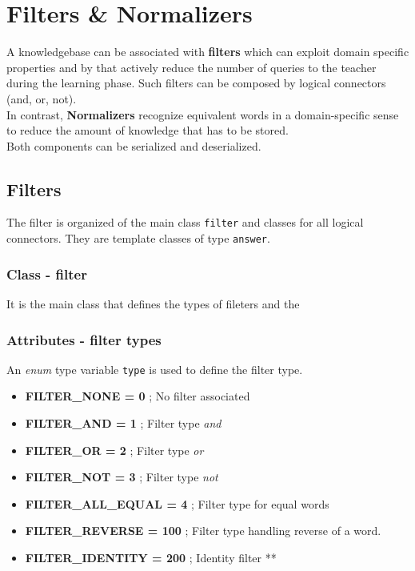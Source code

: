 \chapter{Filters \& Normalizers}
A knowledgebase can be associated with \textbf{filters} which can exploit domain specific properties and by that actively reduce the number of queries to the teacher during the learning phase. Such filters can be composed by logical connectors (and, or, not). \\
In contrast, \textbf{Normalizers} recognize equivalent words in a domain-specific sense to reduce the amount of knowledge that has to be stored. \\
Both components can be serialized and deserialized.

\section{Filters}
The filter is organized of the main class \texttt{filter} and classes for all logical connectors. They are template classes of type \texttt{answer}. 

\subsection{Class - filter}
It is the main class that defines the types of fileters and the 

\subsection*{Attributes - filter types}
An \emph{enum} type variable \texttt{type} is used to define the filter type.
\begin{itemize}
 \item \textbf{FILTER\_NONE = 0} ; No filter associated
 \item \textbf{FILTER\_AND = 1} ; Filter type \emph{and}
 \item \textbf{FILTER\_OR = 2} ; Filter type \emph{or}
 \item \textbf{FILTER\_NOT = 3} ; Filter type \emph{not}
 \item \textbf{FILTER\_ALL\_EQUAL = 4} ; Filter type for equal words
 \item \textbf{FILTER\_REVERSE = 100} ; Filter type handling reverse of a word.
 \item \textbf{FILTER\_IDENTITY = 200} ; Identity filter **
\end{itemize}


